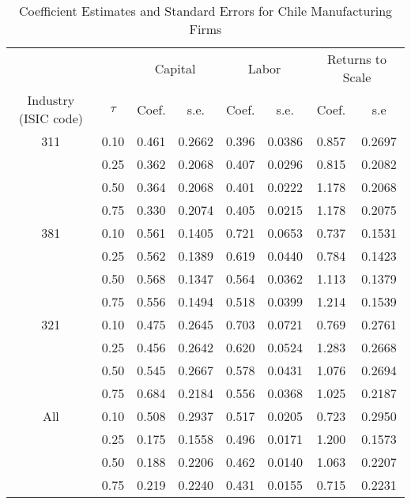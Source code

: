 \begin{table}[ht]
\centering
\caption{Coefficient Estimates and Standard Errors for Chile Manufacturing Firms} 
\begin{tabular}{cccccccc}
  \hline\hline & & \multicolumn{2}{c}{Capital}  & \multicolumn{2}{c}{Labor} & \multicolumn{2}{c}{Returns to Scale} \\ \cmidrule(lr){3-4} \cmidrule(lr){5-6} \cmidrule(lr){7-8}Industry (ISIC code) & $\tau$ & Coef. & s.e. & Coef. & s.e. & Coef. & s.e \\ 
  \hline
311 & 0.10 & 0.461 & 0.2662 & 0.396 & 0.0386 & 0.857 & 0.2697 \\ 
   & 0.25 & 0.362 & 0.2068 & 0.407 & 0.0296 & 0.815 & 0.2082 \\ 
   & 0.50 & 0.364 & 0.2068 & 0.401 & 0.0222 & 1.178 & 0.2068 \\ 
   & 0.75 & 0.330 & 0.2074 & 0.405 & 0.0215 & 1.178 & 0.2075 \\ 
  381 & 0.10 & 0.561 & 0.1405 & 0.721 & 0.0653 & 0.737 & 0.1531 \\ 
   & 0.25 & 0.562 & 0.1389 & 0.619 & 0.0440 & 0.784 & 0.1423 \\ 
   & 0.50 & 0.568 & 0.1347 & 0.564 & 0.0362 & 1.113 & 0.1379 \\ 
   & 0.75 & 0.556 & 0.1494 & 0.518 & 0.0399 & 1.214 & 0.1539 \\ 
  321 & 0.10 & 0.475 & 0.2645 & 0.703 & 0.0721 & 0.769 & 0.2761 \\ 
   & 0.25 & 0.456 & 0.2642 & 0.620 & 0.0524 & 1.283 & 0.2668 \\ 
   & 0.50 & 0.545 & 0.2667 & 0.578 & 0.0431 & 1.076 & 0.2694 \\ 
   & 0.75 & 0.684 & 0.2184 & 0.556 & 0.0368 & 1.025 & 0.2187 \\ 
  All & 0.10 & 0.508 & 0.2937 & 0.517 & 0.0205 & 0.723 & 0.2950 \\ 
   & 0.25 & 0.175 & 0.1558 & 0.496 & 0.0171 & 1.200 & 0.1573 \\ 
   & 0.50 & 0.188 & 0.2206 & 0.462 & 0.0140 & 1.063 & 0.2207 \\ 
   & 0.75 & 0.219 & 0.2240 & 0.431 & 0.0155 & 0.715 & 0.2231 \\ 
   \hline
\end{tabular}
\end{table}
